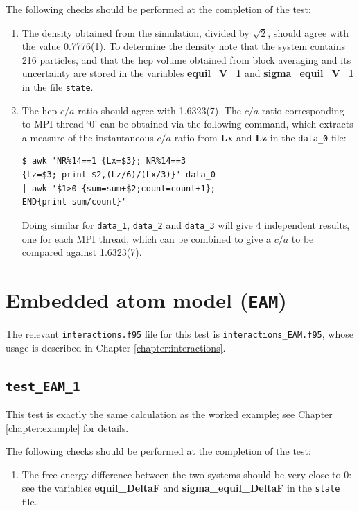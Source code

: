 \documentclass{report}
\begin{document}
The following checks should be performed at the completion of the test:
\begin{enumerate}
\item
The density obtained from the simulation, divided by $\sqrt{2}$, should agree with the value 0.7776(1). To determine the density note 
that the system contains 216 particles, and that the hcp volume obtained from block averaging and its uncertainty are stored in the variables
\textbf{equil\_V\_1} and \textbf{sigma\_equil\_V\_1} in the file \texttt{state}.
\item
The hcp $c/a$ ratio should agree with 1.6323(7). The $c/a$ ratio corresponding to MPI thread `0' can be obtained via the following 
command, which extracts a measure of the instantaneous $c/a$ ratio from \textbf{Lx} and \textbf{Lz} in the \texttt{data\_0} file:
\begin{verbatim}
$ awk 'NR%14==1 {Lx=$3}; NR%14==3 
{Lz=$3; print $2,(Lz/6)/(Lx/3)}' data_0 
| awk '$1>0 {sum=sum+$2;count=count+1}; 
END{print sum/count}'
\end{verbatim}
Doing similar for \texttt{data\_1}, \texttt{data\_2} and \texttt{data\_3} will give 4 independent results, one for each MPI thread, which can be combined
to give a $c/a$ to be compared against 1.6323(7).
\end{enumerate}


\section{Embedded atom model (\texttt{EAM})}
The relevant \texttt{interactions.f95} file for this test is \texttt{interactions\_EAM.f95}, whose usage is described in Chapter
\ref{chapter:interactions}. 

\subsection{\texttt{test\_EAM\_1}}
This test is exactly the same calculation as the worked example; see Chapter \ref{chapter:example} for details.

The following checks should be performed at the completion of the test:
\begin{enumerate}
\item
The free energy difference between the two systems should be very close to 0: see the variables \textbf{equil\_DeltaF} and 
\textbf{sigma\_equil\_DeltaF} in the \texttt{state} file.
\end{enumerate}
\end{document}
